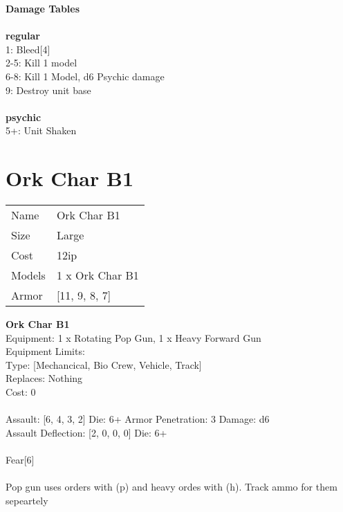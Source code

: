 {\bf Damage Tables} \\
\ \\ {\bf regular } \\
1: Bleed[4] \\
2-5: Kill 1 model \\
6-8: Kill 1 Model, d6 Psychic damage \\
9: Destroy unit base \\
\ \\ {\bf psychic } \\
5+: Unit Shaken \\










\pagebreak\pagebreak

\section{ Ork Char B1 }

\begin{tabular}{ll}
  Name & Ork Char B1 \\
  Size & Large\\
  Cost & 12ip\\
  Models & 1 x Ork Char B1\\
  Armor & [11, 9, 8, 7]\\
\end{tabular}

\noindent 

{\bf Ork Char B1 } \\
Equipment: 1 x Rotating Pop Gun, 1 x Heavy Forward Gun \\
Equipment Limits:  \\
Type: [Mechancical, Bio Crew, Vehicle, Track] \\
Replaces: Nothing \\
Cost: 0\\
\ \\
Assault: [6, 4, 3, 2] Die: 6+ Armor Penetration: 3 Damage: d6 \\
Assault Deflection: [2, 0, 0, 0] Die: 6+\\
\\ 
Fear[6]\\ 
 
\ \\
Pop gun uses orders with (p) and heavy ordes with (h). Track ammo for them sepeartely\\ 

